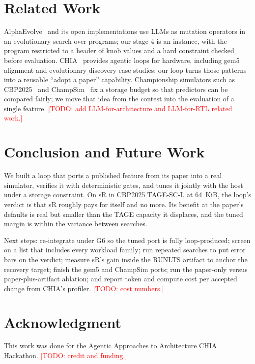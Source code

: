 \documentclass[conference]{IEEEtran}
\newcommand{\todo}[1]{\textcolor{red}{[TODO: #1]}}
\begin{document}
\section{Related Work}\label{sec:related}

AlphaEvolve~\cite{alphaevolve} and its open implementations use LLMs as mutation
operators in an evolutionary search over programs; our stage 4 is an instance,
with the program restricted to a header of knob values and a hard constraint
checked before evaluation. CHIA~\cite{chia} provides agentic loops for
hardware, including gem5 alignment and evolutionary discovery case studies; our
loop turns those patterns into a reusable ``adopt a paper'' capability.
Championship simulators such as CBP2025~\cite{cbp2025kit} and
ChampSim~\cite{champsim} fix a storage budget so that predictors can be
compared fairly; we move that idea from the contest into the evaluation of a
single feature. \todo{add LLM-for-architecture and LLM-for-RTL related work.}

\section{Conclusion and Future Work}\label{sec:conclusion}

We built a loop that ports a published feature from its paper into a real
simulator, verifies it with deterministic gates, and tunes it jointly with the
host under a storage constraint. On sR in CBP2025 TAGE-SC-L at 64~KiB, the
loop's verdict is that sR roughly pays for itself and no more. Its benefit at
the paper's defaults is real but smaller than the TAGE capacity it displaces,
and the tuned margin is within the variance between searches.

Next steps: re-integrate under G6 so the tuned port is fully loop-produced;
screen on a list that includes every workload family; run repeated searches to
put error bars on the verdict; measure sR's gain inside the RUNLTS artifact to
anchor the recovery target; finish the gem5 and ChampSim ports; run the
paper-only versus paper-plus-artifact ablation; and report token and compute
cost per accepted change from CHIA's profiler. \todo{cost numbers.}

\section*{Acknowledgment}
This work was done for the Agentic Approaches to Architecture CHIA Hackathon.
\todo{credit and funding.}
\end{document}

